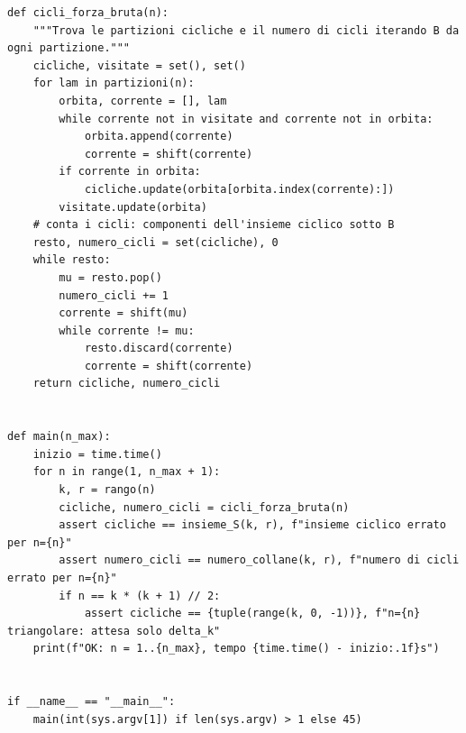 \documentclass[11pt,a4paper]{article}
\begin{document}
\begin{lstlisting}[caption={attempt\_001 code\_1 [python, rigore exact] — Sanity check (not part of the proof): exact brute-force enumeration of all partitions of n — verdetto del Referee: (nessun verdetto)}]
def cicli_forza_bruta(n):
    """Trova le partizioni cicliche e il numero di cicli iterando B da ogni partizione."""
    cicliche, visitate = set(), set()
    for lam in partizioni(n):
        orbita, corrente = [], lam
        while corrente not in visitate and corrente not in orbita:
            orbita.append(corrente)
            corrente = shift(corrente)
        if corrente in orbita:
            cicliche.update(orbita[orbita.index(corrente):])
        visitate.update(orbita)
    # conta i cicli: componenti dell'insieme ciclico sotto B
    resto, numero_cicli = set(cicliche), 0
    while resto:
        mu = resto.pop()
        numero_cicli += 1
        corrente = shift(mu)
        while corrente != mu:
            resto.discard(corrente)
            corrente = shift(corrente)
    return cicliche, numero_cicli


def main(n_max):
    inizio = time.time()
    for n in range(1, n_max + 1):
        k, r = rango(n)
        cicliche, numero_cicli = cicli_forza_bruta(n)
        assert cicliche == insieme_S(k, r), f"insieme ciclico errato per n={n}"
        assert numero_cicli == numero_collane(k, r), f"numero di cicli errato per n={n}"
        if n == k * (k + 1) // 2:
            assert cicliche == {tuple(range(k, 0, -1))}, f"n={n} triangolare: attesa solo delta_k"
    print(f"OK: n = 1..{n_max}, tempo {time.time() - inizio:.1f}s")


if __name__ == "__main__":
    main(int(sys.argv[1]) if len(sys.argv) > 1 else 45)

\end{lstlisting}
\end{document}
